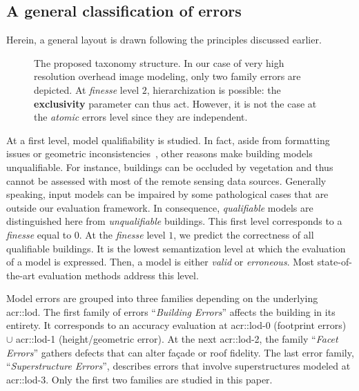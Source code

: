     \subsection{A general classification of errors}
        Herein, a general layout is drawn following the principles discussed earlier.

        \begin{figure}
            \begin{center}
                
                \caption{
                    \label{fig::taxonomy} 
                    The proposed taxonomy structure.
                    In our case of very high resolution overhead image modeling, only two family errors are depicted.
                    At \textit{finesse} level $2$, hierarchization is possible: the \textbf{exclusivity} parameter can thus act.
                    However, it is not the case at the \textit{atomic} errors level since they are independent.
                }
            \end{center}
        \end{figure}

        At a first level, model qualifiability is studied.
        In fact, aside from formatting issues or geometric inconsistencies~\parencite{ledoux2018val3dity}, other reasons make building models unqualifiable.
        For instance, buildings can be occluded by vegetation and thus cannot be assessed with most of the remote sensing data sources.
        Generally speaking, input models can be impaired by some pathological cases that are outside our evaluation framework.
        In consequence, \textit{qualifiable} models are distinguished here from \textit{unqualifiable} buildings.
        This first level corresponds to a \textit{finesse} equal to $0$. At the \textit{finesse} level $1$, we predict the correctness of all qualifiable buildings.
        It is the lowest semantization level at which the evaluation of a model is expressed.
        Then, a model is either \textit{valid} or \textit{erroneous}.
        Most state-of-the-art evaluation methods address this level.

        Model errors are grouped into three families depending on the underlying \gls{acr::lod}.
        The first family of errors ``\textit{Building Errors}'' affects the building in its entirety.
        It corresponds to an accuracy evaluation at \gls{acr::lod}-$0$ (footprint errors) $\cup$ \gls{acr::lod}-1 (height/geometric error).
        At the next \gls{acr::lod}-2, the family ``\textit{Facet Errors}'' gathers defects that can alter fa\c{c}ade or roof fidelity.
        The last error family, ``\textit{Superstructure Errors}'', describes errors that involve superstructures modeled at \gls{acr::lod}-3.
        Only the first two families are studied in this paper.

